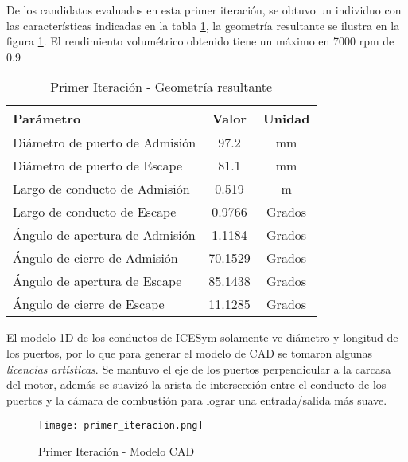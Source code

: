 De los candidatos evaluados en esta primer iteración, se obtuvo un individuo
con las características indicadas en la tabla \ref{tab:primer_it}, la geometría
resultante se ilustra en la figura \ref{fig:primer_it}.
%
El rendimiento volumétrico obtenido tiene un máximo en 7000 rpm de 0.9

\begin{table}
    \centering
    \begin{tabular}{lcc}
      \toprule
      Parámetro & Valor & Unidad\\
      \midrule
      Diámetro de puerto de Admisión & 97.2    & mm\\
      Diámetro de puerto de Escape   & 81.1    & mm \\
      Largo de conducto de Admisión  & 0.519   & m\\
      Largo de conducto de Escape    & 0.9766  & Grados\\
      Ángulo de apertura de Admisión & 1.1184  & Grados\\
      Ángulo de cierre de Admisión   & 70.1529 & Grados\\
      Ángulo de apertura de Escape   & 85.1438 & Grados\\
      Ángulo de cierre de Escape     & 11.1285 & Grados\\ \bottomrule
    \end{tabular}
    \caption{Primer Iteración - Geometría resultante}
    \label{tab:primer_it}
\end{table}

El modelo 1D de los conductos de ICESym solamente ve diámetro y longitud  de los
puertos, por lo que para generar el modelo de CAD se tomaron algunas
\emph{licencias artísticas}.
%
Se mantuvo el eje de los puertos perpendicular a la carcasa del motor, además se
suavizó la arista de intersección entre el conducto de los puertos y la cámara
de combustión para lograr una entrada/salida más suave.

\begin{figure}
  \centering
  \texttt{[image: primer\_iteracion.png]}
  \caption{Primer Iteración - Modelo CAD}
  \label{fig:primer_it}
\end{figure}
